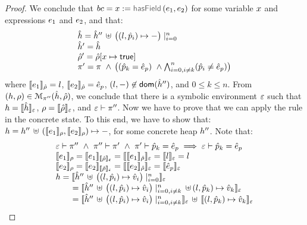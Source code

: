 \begin{proof}
\noindent{}
We conclude that  $\bcmd = \jvar := \hasfield(\jsilexpr_1, \jsilexpr_2)$ for some variable $\jvar$ and expressions $\jsilexpr_1$ and $\jsilexpr_2$, and that: 
$$
\begin{array}{l}
  \sheap =   \sheap'' \, \uplus \, \big((l, \sexprp_i) \mapsto -\big)\mid_{i = 0}^n     \\
  \sheap' =  \sheap \\
  \sstore' = \sstore[\jvar \mapsto \jtrue] \\ 
    \pc' = \pc \ \wedge \, \big( (\sexprp_k = \sexpr_p) \ \wedge \bigwedge_{i = 0, i \neq k}^n (\sexprp_i \neq \sexpr_p) \big)
\end{array}
$$ 
where $\symbeval{\jsilexpr_1}{\sstore} =  \loc$, $\symbeval{\jsilexpr_2}{\sstore} =  \sexpr_p$, 
$(\loc, -) \not\in \domain(\sheap'')$, and $0 \leq k \leq n$. 
%
From $(\heap, \store) \in \smodels{\sheap, \sstore}{\pc''}$, we conclude that there is a symbolic environment
$\senv$ such that $\heap = \semexpr{\sheap}{\senv}$, $\store = \semexpr{\sstore}{\senv}$, and 
$\senv \vdash \pc''$. 
Now we have to prove that we can apply the  rule in the concrete state.
To this end, we have to show that:
$\heap = \heap'' \dunion (\symbeval{\jsilexpr_1}{\store}, \symbeval{\jsilexpr_2}{\store}) \mapsto -$, for 
some concrete heap $\heap''$. 
Note that: 
$$
\begin{array}{l}
%
\senv \vdash \pc'' \ \wedge \ \pc'' \vdash \pc' \ \wedge \ \pc' \vdash \sexprp_k = \sexpr_p \implies \senv \vdash \sexprp_k = \sexpr_p \\
%
 \symbeval{\jsilexpr_1}{\store} = \symbeval{\jsilexpr_1}{\symbeval{\sstore}{\senv}} = \symbeval{\symbeval{\jsilexpr_1}{\sstore}}{\senv} 
    = \symbeval{\loc}{\senv} = \loc \\ 
  \symbeval{\jsilexpr_2}{\store}  = \symbeval{\jsilexpr_2}{\semexpr{\sstore}{\senv}} =  \symbeval{\symbeval{\jsilexpr_2}{\sstore}}{\senv}
   =  \symbeval{\sexpr_p}{\senv} \\
 \heap = \semexpr{\sheap'' \, \uplus \, \big((l, \sexprp_i) \mapsto \sexprv_i\big)\mid_{i = 0}^n}{\senv} \\
    \qquad = \semexpr{\sheap'' \, \uplus \, \big((l, \sexprp_i) \mapsto \sexprv_i\big)\mid_{i = 0, i\neq k}^n \dunion (l, \sexprp_k) \mapsto \sexprv_k}{\senv} \\
    \qquad = \semexpr{\sheap'' \, \uplus \, \big((l, \sexprp_i) \mapsto \sexprv_i\big)\mid_{i = 0, i\neq k}^n}{\senv} \dunion \semexpr{(l, \sexprp_k) \mapsto \sexprv_k}{\senv} \\

\end{array}$$
\end{proof}
